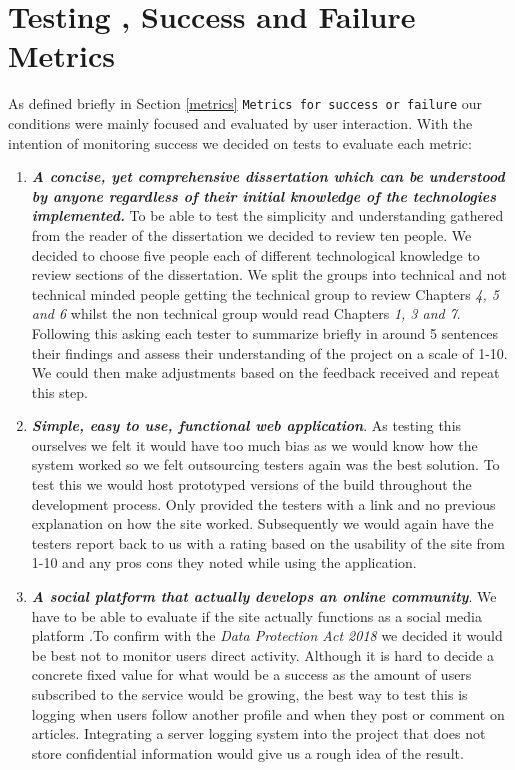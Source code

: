 \section{Testing , Success and Failure Metrics} 
As defined briefly in Section \ref{metrics} \texttt{Metrics for success or failure} our conditions were mainly focused and evaluated by user interaction. With the intention of monitoring  success we decided on tests to evaluate each metric:

\begin{enumerate}
  \item \textbf{\textit{A  concise,  yet  comprehensive  dissertation  which  can  be  understood  by
anyone  regardless  of  their  initial  knowledge  of  the  technologies  implemented.}} To be able to test the simplicity and understanding gathered from the reader of the dissertation we decided to review ten people. We decided to choose five people each of different technological knowledge to review sections of the dissertation. We split the groups into technical and not technical minded people getting the technical group to review Chapters \textit{4, 5 and 6} whilst the non technical group would read Chapters \textit{1, 3 and 7}. Following this asking each tester to summarize briefly in around 5 sentences their findings and assess their understanding of the project on a scale of 1-10. We could then make adjustments based on the feedback received and repeat this step.

  \item \textbf{\textit{ Simple, easy to use, functional web application}}. As testing this ourselves we felt it would have too much bias as we would know how the system worked so we felt outsourcing testers again was the best solution. To test this we would host prototyped versions of the build throughout the development process. Only provided the testers with a link and no previous explanation on how the site worked. Subsequently we would again have the testers report back to us with a rating based on the usability of the site from 1-10 and any pros cons they noted while using the application.
  
  \item \textbf{\textit{A social platform that actually develops an online community}}. We have to be able to evaluate if the site actually functions as a social media platform .To confirm with the \textit{Data Protection Act 2018} \cite{dpa} we decided it would be best not to monitor users direct activity. Although it is hard to decide a concrete fixed value for what would be a success as the amount of users subscribed to the service would be growing, the best way to test this is logging when users follow another profile and when they post or comment on articles. Integrating a server logging system into the project that does not store confidential information would give us a rough idea of the result.
  

\end{enumerate}
